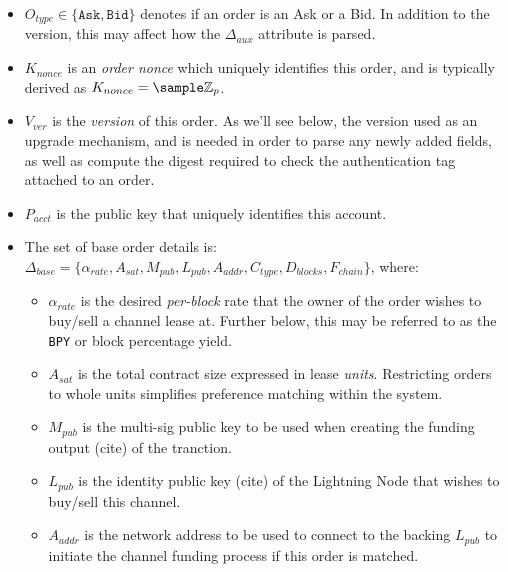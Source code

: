 \documentclass[10pt,a4paper]{article}
\theoremstyle{definition}
\begin{document}
\begin{itemize}
    \item $O_{type} \in \{\texttt{Ask}, \texttt{Bid}\}$ denotes if an order is
        an Ask or a Bid. In addition to the version, this may affect how the
        $\Delta_{aux}$ attribute is parsed.

    \item $K_{nonce}$ is an \emph{order nonce} which uniquely identifies this
        order, and is typically derived as $K_{nonce} = \sample
        \mathbb{Z}_{p}$.

    \item $V_{ver}$ is the \emph{version} of this order. As we'll see below,
        the version used as an upgrade mechanism, and is needed in order to
        parse any newly added fields, as well as compute the digest required to
        check the authentication tag attached to an order.

    \item $P_{acct}$ is the public key that uniquely identifies this account. 

    \item The set of base order details is: \\ $\Delta_{base} = \{
        \alpha_{rate}, A_{sat}, M_{pub}, L_{pub}, A_{addr}, C_{type},
    D_{blocks}, F_{chain} \}$, where:

    \begin{itemize}

        \item $\alpha_{rate}$ is the desired \emph{per-block} rate that the owner
            of the order wishes to buy/sell a channel lease at. Further below, this
            may be referred to as the \texttt{BPY} or block percentage yield.

        \item $A_{sat}$ is the total contract size expressed in lease \emph{units}.
            Restricting orders to whole units simplifies preference matching within
            the system.

        \item $M_{pub}$ is the multi-sig public key to be used when creating
            the funding output (cite) of the tranction. %

        \item $L_{pub}$ is the identity public key (cite) of the Lightning
            Node that wishes to buy/sell this channel.

        \item $A_{addr}$ is the network address to be used to connect to the
            backing $L_{pub}$ to initiate the channel funding process if this
            order is matched. %


\end{itemize}
\end{itemize}
\end{document}
